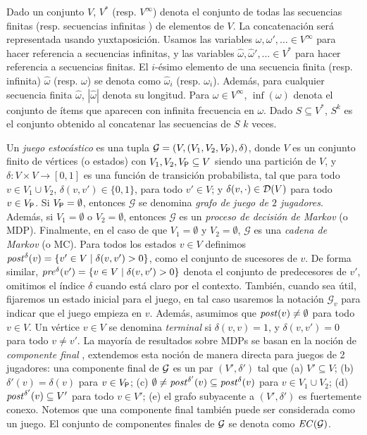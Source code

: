 	 Dado un conjunto $V$, $V^*$ (resp. $V^\infty$) denota el conjunto de todas las secuencias finitas (resp. secuencias infinitas ) de elementos de $V$. La concatenación será representada usando yuxtaposición. Usamos las variables $\omega, \omega', \dots \in V^\infty$ para hacer referencia a secuencias infinitas, y las variables $\hat{\omega}, \hat{\omega}', \dots \in V^*$ para hacer referencia a secuencias finitas. El $i$-ésimo elemento de una secuencia finita (resp. infinita) $\hat{\omega}$ (resp. $\omega$) se denota como
$\hat{\omega}_i$ (resp. $\omega_i$). Además, para cualquier secuencia finita $\hat{\omega}$, $|\hat{\omega}|$ denota su longitud. Para $\omega \in V^\infty$, $\inf(\omega)$ denota el conjunto de ítems que aparecen con infinita frecuencia en $\omega$. Dado
$S \subseteq V^*$, $S^k$ es el conjunto obtenido al concatenar las secuencias de $S$ $k$ veces.
	 
Un \emph{juego estocástico} \cite{ChatterjeeH12,SvorenovaKwiatkowska16} es una tupla $\mathcal{G} = ( V,  (V_1, V_2, V_{\mathsf{P}}), \delta  ) $, donde $V$ es un conjunto finito de vértices (o estados) con $V_1, V_2, V_{\mathsf{P}} \subseteq V$ siendo una partición de $V$, y $\delta : V \times V \rightarrow [0,1]$ es una función de transición probabilista, tal que para todo $v \in V_1\cup V_2$, $\delta(v,v') \in  \{0,1\}$, para todo $v' \in V$; y $\delta(v,\cdot) \in \mathcal{D}(V)$ para todo $v \in V_{\mathsf{P}}$.
Si $V_{\mathsf{P}} = \emptyset$, entonces $\mathcal{G}$ se denomina \emph{grafo de juego de $2$ jugadores}. Además, si $V_1 = \emptyset$ o $V_2 = \emptyset$, entonces $\mathcal{G}$ es un \emph{proceso de decisión de Markov} (o MDP). Finalmente, en el caso de que $V_1= \emptyset$ y $V_2 = \emptyset$, $\mathcal{G}$ es una \emph{cadena de Markov} (o MC). Para todos los estados $v \in V$ definimos $\mathit{post}^\delta(v) = \{v' \in V \mid \delta(v,v')>0 \}$, como el conjunto de sucesores de $v$. De forma similar, $\mathit{pre}^\delta(v') = \{v \in V \mid \delta(v,v')>0 \}$ denota el conjunto de predecesores de $v'$, omitimos el índice $\delta$ cuando está claro por el contexto. También, cuando sea útil, fijaremos un estado inicial para el juego, en tal caso usaremos la notación $\mathcal{G}_v$ para indicar que el juego empieza en $v$. Además, asumimos que $\mathit{post}(v) \neq \emptyset$ para todo
$v \in V$.
Un vértice $v \in V$ se denomina \emph{terminal} si $\delta(v,v) = 1$, y $\delta(v,v')=0$ para todo $v \neq v'$.
La mayoría de resultados sobre MDPs se basan en la noción de \emph{componente final} \cite{BaierK08}, extendemos esta noción de manera directa para juegos de 2 jugadores: una componente final de $\mathcal{G}$ es un par $(V',\delta')$ tal que (a) $V' \subseteq V$; (b) $\delta'(v) = \delta(v)$ para $v \in V_{\mathsf{P}}$; (c) $\emptyset \neq \mathit{post}^{\delta'}(v) \subseteq \mathit{post}^\delta(v)$ para $v \in V_1 \cup V_2$; (d) $\mathit{post}^{\delta'}(v) \subseteq V'$ para todo $v \in V'$; (e) el grafo subyacente a $(V',\delta')$ es fuertemente conexo.  Notemos que una componente final también puede ser considerada como un juego. El conjunto de componentes finales de $\mathcal{G}$ se denota como $\mathit{EC}(\mathcal{G})$.
 
